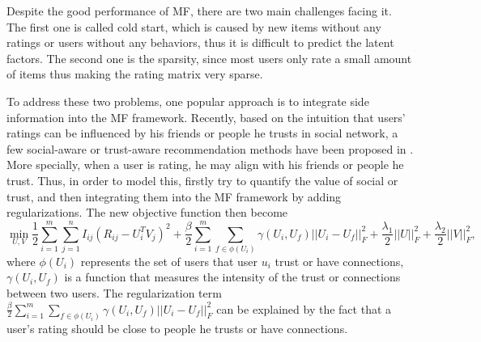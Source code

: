 Despite the good performance of MF, there are two main challenges facing it. The first one is called cold start, which is caused by new items without any ratings or users without any behaviors, thus it is difficult to predict the latent factors. 
The second one is the sparsity, since most users only rate a small amount of items thus making the rating matrix very sparse.

To address these two problems, one popular approach is to integrate side information into the MF framework. Recently, based on the intuition that users' ratings can be influenced by his friends or people he trusts in social network, a few social-aware or trust-aware recommendation methods have been proposed in \cite{jamali2010matrix}\cite{ma2009llearningEnsembel}\cite{ma2009learningTrust}\cite{ma2008sorec}\cite{ma2011recommender}\cite{massa2004trust}\cite{yang2013social}. More specially, when a user is rating, he may align with his friends or people he trust. Thus, in order to model this, \cite{jamali2010matrix}\cite{ma2009llearningEnsembel}\cite{ma2009learningTrust}\cite{ma2008sorec}\cite{ma2011recommender}\cite{massa2004trust} firstly try to quantify the value of social or trust, and then integrating them into the MF framework by adding regularizations. The new objective function then become
\begin{equation}
\min_{U,V}\frac{1}{2}\sum_{i=1}^{m}\sum_{j=1}^{n}I_{ij}(R_{ij} - U_i^TV_j)^2 + \frac{\beta}{2}\sum_{i=1}^{m}\sum_{f \in \phi(U_i)}\gamma(U_i, U_f)||U_i - U_f||_F^2 + \frac{\lambda_1}{2}||U||_F^2 + \frac{\lambda_2}{2}||V||_F^2,
\end{equation} 
where $\phi(U_i)$ represents the set of users that user $u_i$ trust or have connections, $\gamma(U_i,U_f)$ is a function that measures the intensity of the trust or connections between two users. The regularization term $\frac{\beta}{2}\sum_{i=1}^{m}\sum_{f \in \phi(U_i)}\gamma(U_i, U_f)||U_i - U_f||_F^2$ can be explained by the fact that a user's rating should be close to people he trusts or have connections.
